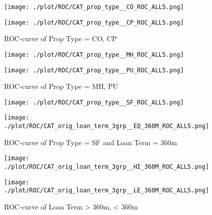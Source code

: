 \begin{figure}[H]
\begin{minipage}{.5\textwidth}
	\centering
	\texttt{[image: ./plot/ROC/CAT\_prop\_type\_\_CO\_ROC\_ALL5.png]}
\end{minipage}%
\begin{minipage}{.5\textwidth}
	\centering
	\texttt{[image: ./plot/ROC/CAT\_prop\_type\_\_CP\_ROC\_ALL5.png]}
\end{minipage}
    \caption{ROC-curve of Prop Type = CO, CP}
\end{figure}

\begin{figure}[H]
\begin{minipage}{.5\textwidth}
	\centering
	\texttt{[image: ./plot/ROC/CAT\_prop\_type\_\_MH\_ROC\_ALL5.png]}
\end{minipage}%
\begin{minipage}{.5\textwidth}
	\centering
	\texttt{[image: ./plot/ROC/CAT\_prop\_type\_\_PU\_ROC\_ALL5.png]}
\end{minipage}
    \caption{ROC-curve of Prop Type = MH, PU}
\end{figure}

\begin{figure}[H]
\begin{minipage}{.5\textwidth}
	\centering
	\texttt{[image: ./plot/ROC/CAT\_prop\_type\_\_SF\_ROC\_ALL5.png]}
\end{minipage}%
\begin{minipage}{.5\textwidth}
	\centering
	\texttt{[image: ./plot/ROC/CAT\_orig\_loan\_term\_3grp\_\_EQ\_360M\_ROC\_ALL5.png]}
\end{minipage}
    \caption{ROC-curve of Prop Type = SF and Loan Term = 360m}
\end{figure}

\begin{figure}[H]
\begin{minipage}{.5\textwidth}
	\centering
	\texttt{[image: ./plot/ROC/CAT\_orig\_loan\_term\_3grp\_\_HI\_360M\_ROC\_ALL5.png]}
\end{minipage}%
\begin{minipage}{.5\textwidth}
	\centering
	\texttt{[image: ./plot/ROC/CAT\_orig\_loan\_term\_3grp\_\_LE\_360M\_ROC\_ALL5.png]}
\end{minipage}
    \caption{ROC-curve of Loan Term > 360m, < 360m}
\end{figure}

